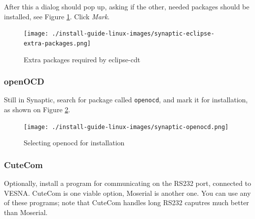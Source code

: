 \documentclass[a4paper, 10pt]{article}
\begin{document}
After this a dialog should pop up, asking if the other, needed packages should be installed,
see Figure \ref{fig:synaptic-eclipse-extra-packages.png}. Click \emph{Mark}.

    \begin{figure}[H]
    \centering
        \texttt{[image: ./install-guide-linux-images/synaptic-eclipse-extra-packages.png]}
        \caption{Extra packages required by eclipse-cdt}
        \label{fig:synaptic-eclipse-extra-packages.png}
    \end{figure}

\subsubsection{openOCD}

Still in Synaptic, search for package called \verb+openocd+,
and mark it for installation, as shown on Figure \ref{fig:synaptic-openocd}.


    \begin{figure}[H]
    \centering
        \texttt{[image: ./install-guide-linux-images/synaptic-openocd.png]}
        \caption{Selecting openocd for installation}
        \label{fig:synaptic-openocd}
    \end{figure}




\subsubsection{CuteCom}

Optionally, install a program for communicating on the RS232 port,
connected to VESNA.
CuteCom is one viable option, Moserial is another one.
You can use any of these programs; note that CuteCom handles long
RS232 caputres much better than Moserial.
\end{document}
